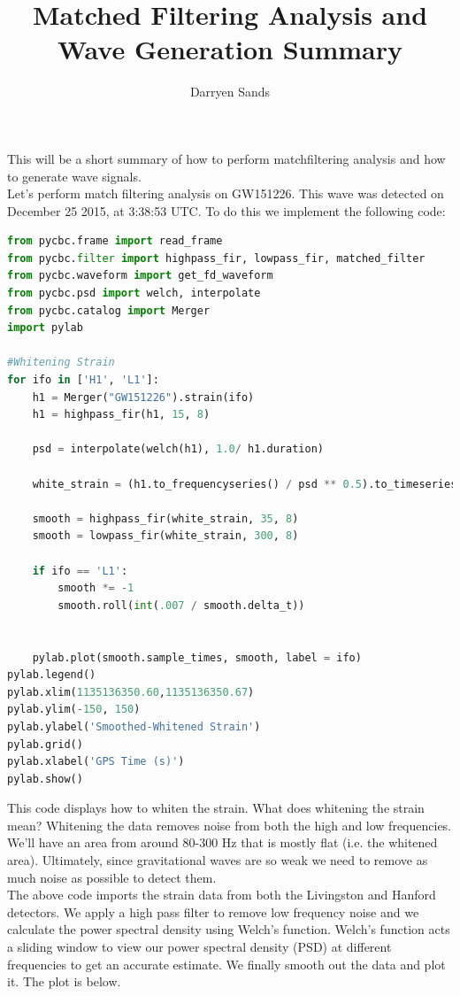 \documentclass[]{article}
\author{Darryen Sands}
\title{Matched Filtering Analysis and Wave Generation Summary}
\begin{document}
This will be a short summary of how to perform matchfiltering analysis and how to generate wave signals. \\

Let's perform match filtering analysis on GW151226. This wave was detected on December 25 2015, at 3:38:53 UTC. To do this we implement the following code:

\begin{lstlisting}[language = Python]
from pycbc.frame import read_frame
from pycbc.filter import highpass_fir, lowpass_fir, matched_filter
from pycbc.waveform import get_fd_waveform
from pycbc.psd import welch, interpolate
from pycbc.catalog import Merger
import pylab 

#Whitening Strain
for ifo in ['H1', 'L1']:
    h1 = Merger("GW151226").strain(ifo)
    h1 = highpass_fir(h1, 15, 8)

    psd = interpolate(welch(h1), 1.0/ h1.duration)

    white_strain = (h1.to_frequencyseries() / psd ** 0.5).to_timeseries()
    
    smooth = highpass_fir(white_strain, 35, 8)
    smooth = lowpass_fir(white_strain, 300, 8)

    if ifo == 'L1':
        smooth *= -1 
        smooth.roll(int(.007 / smooth.delta_t))


    pylab.plot(smooth.sample_times, smooth, label = ifo)
pylab.legend()
pylab.xlim(1135136350.60,1135136350.67)
pylab.ylim(-150, 150)
pylab.ylabel('Smoothed-Whitened Strain')
pylab.grid()
pylab.xlabel('GPS Time (s)')
pylab.show()
\end{lstlisting}

This code displays how to whiten the strain. What does whitening the strain mean? Whitening the data removes noise from both the high and low frequencies. We'll have an area from around 80-300 Hz that is mostly flat (i.e. the whitened area). Ultimately, since gravitational waves are so weak we need to remove as much noise as possible to detect them. \\

The above code imports the strain data from both the Livingston and Hanford detectors. We apply a high pass filter to remove low frequency noise and we calculate the power spectral density using Welch's function. Welch's function acts a sliding window to view our power spectral density (PSD) at different frequencies to get an accurate estimate. We finally smooth out the data and plot it. The plot is below. \\
\end{document}
